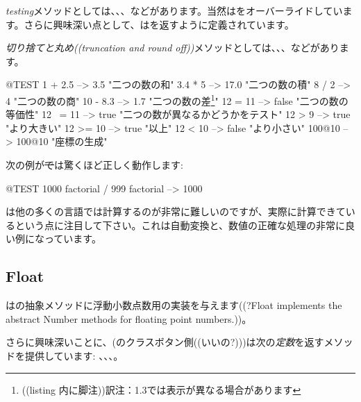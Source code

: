 \documentclass[a4paper,10pt,twoside]{book}
\begin{document}
\emph{testing}メソッドとしては、、、などがあります。当然はをオーバーライドしています。さらに興味深い点として、はを返すように定義されています。

\emph{切り捨てと丸め((truncation and round off))}メソッドとしては、、、などがあります。

\begin{code}{@TEST}
1 + 2.5     --> 3.5             "二つの数の和"
3.4 * 5      --> 17.0           "二つの数の積"
8 / 2         --> 4                 "二つの数の商"
10 - 8.3   --> 1.7              "二つの数の差\footnote{((listing 内に脚注))訳注：\pharo 1.3では表示が異なる場合があります}"
12 = 11    --> false           "二つの数の等価性"
12 ~= 11 --> true            "二つの数が異なるかどうかをテスト"
12 > 9      --> true            "より大きい"
12 >= 10  --> true            "以上"
12 < 10    --> false           "より小さい"
100@10   --> 100@10    "座標の生成"
\end{code}

次の例が\st では驚くほど正しく動作します:
\begin{code}{@TEST}
1000 factorial / 999 factorial --> 1000
\end{code}
は他の多くの言語では計算するのが非常に難しいのですが、実際に計算できているという点に注目して下さい。これは自動変換と、数値の正確な処理の非常に良い例になっています。


\subsection{Float}

はの抽象メソッドに浮動小数点数用の実装を与えます((?Float implements the abstract Number methods for floating point numbers.))。

さらに興味深いことに、(\ie{}のクラスボタン側((いいの?)))は次の\emph{定数}を返すメソッドを提供しています: 、、、。
\end{document}
